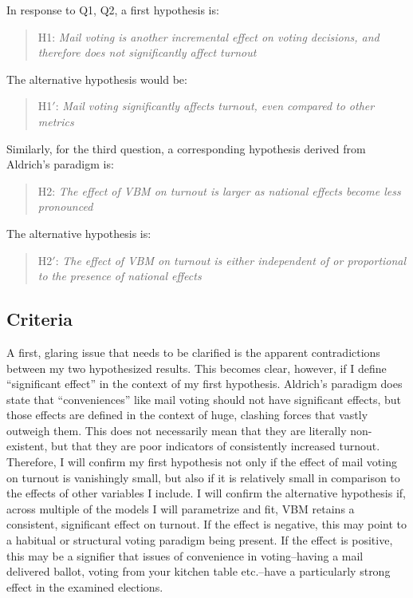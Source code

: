 \documentclass[12pt,twoside]{reedthesis}
\begin{document}
  In response to Q1, Q2, a first hypothesis is:
  
  \begin{quotation}  
  H1: \textit{Mail voting is another incremental effect on voting decisions, and therefore
  does not significantly affect turnout}
  \end{quotation}
  
  The alternative hypothesis would be:
  
  \begin{quotation}  
  H1$'$: \textit{Mail  voting  significantly  affects  turnout,  even  compared  to  other  metrics}
  \end{quotation}
  
  Similarly, for the third question, a corresponding hypothesis derived
  from Aldrich's paradigm is:
  
  \begin{quotation}  
  H2: \textit{The  effect  of  VBM  on  turnout  is  larger  as  national  effects  become less pronounced}
  \end{quotation}
  
  The alternative hypothesis is:
  
  \begin{quotation}  
  H2$'$: \textit{The  effect  of  VBM  on  turnout  is either independent of or proportional to the presence of national effects}
  \end{quotation}
  
  \subsection{Criteria}\label{criteria}
  
  A first, glaring issue that needs to be clarified is the apparent
  contradictions between my two hypothesized results. This becomes clear,
  however, if I define ``significant effect'' in the context of my first
  hypothesis. Aldrich's paradigm does state that ``conveniences'' like
  mail voting should not have significant effects, but those effects are
  defined in the context of huge, clashing forces that vastly outweigh
  them. This does not necessarily mean that they are literally
  non-existent, but that they are poor indicators of consistently
  increased turnout. Therefore, I will confirm my first hypothesis not
  only if the effect of mail voting on turnout is vanishingly small, but
  also if it is relatively small in comparison to the effects of other
  variables I include. I will confirm the alternative hypothesis if,
  across multiple of the models I will parametrize and fit, VBM retains a
  consistent, significant effect on turnout. If the effect is negative,
  this may point to a habitual or structural voting paradigm being
  present. If the effect is positive, this may be a signifier that issues
  of convenience in voting--having a mail delivered ballot, voting from
  your kitchen table etc.--have a particularly strong effect in the
  examined elections.
  
\end{document}
